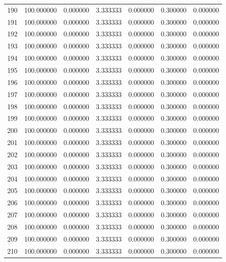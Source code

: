 \begin{tabular}{rrrrrrr}
190 & 100.000000 &    0.000000 &  3.333333 &   0.000000 &   0.300000 &  0.000000 \\
191 & 100.000000 &    0.000000 &  3.333333 &   0.000000 &   0.300000 &  0.000000 \\
192 & 100.000000 &    0.000000 &  3.333333 &   0.000000 &   0.300000 &  0.000000 \\
193 & 100.000000 &    0.000000 &  3.333333 &   0.000000 &   0.300000 &  0.000000 \\
194 & 100.000000 &    0.000000 &  3.333333 &   0.000000 &   0.300000 &  0.000000 \\
195 & 100.000000 &    0.000000 &  3.333333 &   0.000000 &   0.300000 &  0.000000 \\
196 & 100.000000 &    0.000000 &  3.333333 &   0.000000 &   0.300000 &  0.000000 \\
197 & 100.000000 &    0.000000 &  3.333333 &   0.000000 &   0.300000 &  0.000000 \\
198 & 100.000000 &    0.000000 &  3.333333 &   0.000000 &   0.300000 &  0.000000 \\
199 & 100.000000 &    0.000000 &  3.333333 &   0.000000 &   0.300000 &  0.000000 \\
200 & 100.000000 &    0.000000 &  3.333333 &   0.000000 &   0.300000 &  0.000000 \\
201 & 100.000000 &    0.000000 &  3.333333 &   0.000000 &   0.300000 &  0.000000 \\
202 & 100.000000 &    0.000000 &  3.333333 &   0.000000 &   0.300000 &  0.000000 \\
203 & 100.000000 &    0.000000 &  3.333333 &   0.000000 &   0.300000 &  0.000000 \\
204 & 100.000000 &    0.000000 &  3.333333 &   0.000000 &   0.300000 &  0.000000 \\
205 & 100.000000 &    0.000000 &  3.333333 &   0.000000 &   0.300000 &  0.000000 \\
206 & 100.000000 &    0.000000 &  3.333333 &   0.000000 &   0.300000 &  0.000000 \\
207 & 100.000000 &    0.000000 &  3.333333 &   0.000000 &   0.300000 &  0.000000 \\
208 & 100.000000 &    0.000000 &  3.333333 &   0.000000 &   0.300000 &  0.000000 \\
209 & 100.000000 &    0.000000 &  3.333333 &   0.000000 &   0.300000 &  0.000000 \\
210 & 100.000000 &    0.000000 &  3.333333 &   0.000000 &   0.300000 &  0.000000 \\

\end{tabular}
